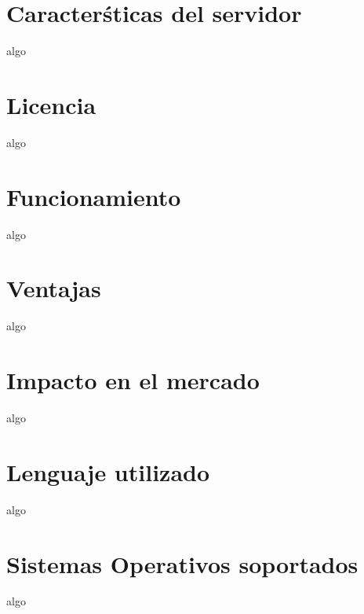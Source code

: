 \section{Caracter\'sticas del servidor}
  algo 
\section{Licencia}
  algo
\section{Funcionamiento}
  algo
\section{Ventajas}
  algo
\section{Impacto en el mercado}
  algo
\section{Lenguaje utilizado}
  algo
\section{Sistemas Operativos soportados}
  algo
